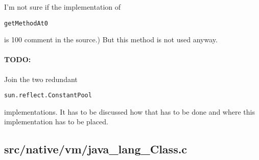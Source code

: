 \documentclass[a4paper, 10pt, titlepage]{scrartcl} %
\begin{document}
I'm not sure if the implementation of \begin{scriptsize}\verb|getMethodAt0|\end{scriptsize} is 100%
comment in the source.) But this method is not used anyway.

\paragraph{TODO:}
\label{par:TODO/join-constantpool-implementations}Join the two redundant \begin{scriptsize}\verb|sun|\hspace{0.0pt}\verb|.|\hspace{0.0pt}\verb|reflect|\hspace{0.0pt}\verb|.|\hspace{0.0pt}\verb|ConstantPool|\end{scriptsize}
implementations. It has to be discussed how that has to be done and where this
implementation has to be placed.

\subsection{src/native/vm/java\_lang\_Class.c}
\label{sec:src/native/vm/java_lang_Class.c}
\end{document}
